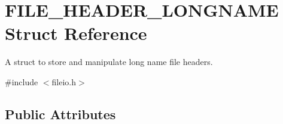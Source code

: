 \hypertarget{struct_f_i_l_e___h_e_a_d_e_r___l_o_n_g_n_a_m_e}{}\section{F\+I\+L\+E\+\_\+\+H\+E\+A\+D\+E\+R\+\_\+\+L\+O\+N\+G\+N\+A\+M\+E Struct Reference}
\label{struct_f_i_l_e___h_e_a_d_e_r___l_o_n_g_n_a_m_e}


A struct to store and manipulate long name file headers.  




{\ttfamily \#include $<$fileio.\+h$>$}

\subsection*{Public Attributes}
